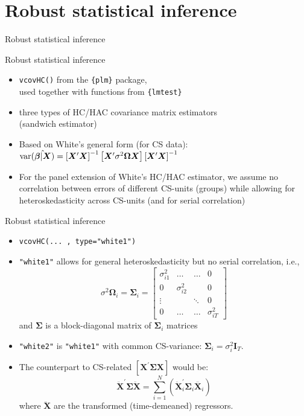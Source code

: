 \documentclass{beamer}
\begin{document}
\section{Robust statistical inference}
\begin{frame}{Robust statistical inference}
\end{frame}
\begin{frame}{Robust statistical inference}
\begin{itemize}
    \item \texttt{vcovHC()} from the \texttt{\{plm\}} package, 
    \\used together with functions from \texttt{\{lmtest\}}
    \smallskip
    \item three types of HC/HAC covariance matrix estimators \\(sandwich estimator)
    \smallskip
    \item Based on White's general form (for CS data):\\ \medskip 
    $\textnormal{var}(\hat{\bm{\beta}|\bm{X}})= 
    \left[ \bm{X}^{\prime} \bm{X} \right]^{-1}
    \left[ \bm{X}^{\prime} \sigma^2 \bm{\Omega} \bm{X} \right]
    \left[ \bm{X}^{\prime} \bm{X} \right]^{-1}$ \\ \medskip
    \smallskip
    \item For the panel extension of White's HC/HAC estimator, we assume no correlation between errors of different CS-units (groups) while allowing for heteroskedasticity across CS-units (and for serial correlation)
\end{itemize}
\end{frame}
\begin{frame}{Robust statistical inference}
\begin{itemize}
    \item \texttt{vcovHC(... , type="white1")}
    \medskip
    \item \texttt{"white1"} allows for general heteroskedasticity but no serial correlation, i.e.,
    $$
    \sigma^2 \bm{\Omega}_i = \bm{\Sigma}_i =
    \begin{bmatrix}
    \sigma_{i1}^2 & \dots & \dots & 0 \\
    0 & \sigma_{i2}^2 &  & 0 \\
    \vdots & & \ddots & 0 \\
    0 & \dots & \dots & \sigma_{iT}^2
    \end{bmatrix}
    $$
    and $\bm{\Sigma}$ is a block-diagonal matrix of $\bm{\Sigma}_i$ matrices
    \smallskip
    \item \texttt{"white2"} is \texttt{"white1"} with common CS-variance: $\bm{\Sigma}_i = \sigma^2_i \bm{I}_T$.
    \smallskip
    \item The counterpart to CS-related $\left[ \bm{X}^{\prime} \bm{\Sigma} \bm{X} \right]$ would be:
    $$
    \ddot{\bm{X}}^{\prime} \bm{\Sigma} \ddot{\bm{X}} = 
    \sum_{i=1}^N \left( 
    \ddot{\bm{X}}_i^{\prime} \bm{\Sigma}_i \ddot{\bm{X}_i}
    \right)
    $$
    where $\ddot{\bm{X}}$ are the transformed (time-demeaned) regressors.
\end{itemize}
\end{frame}
\end{document}
